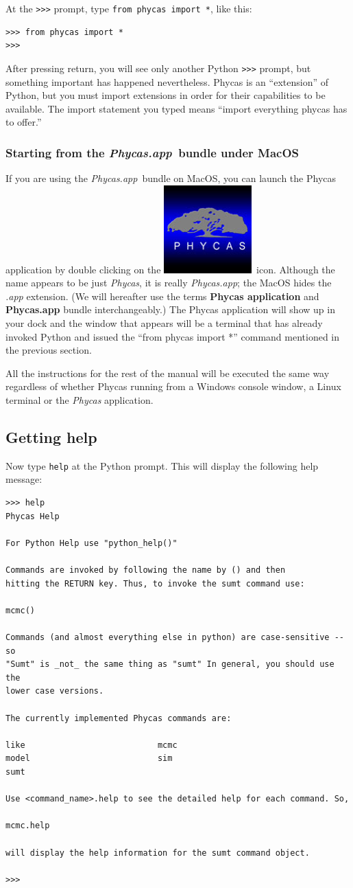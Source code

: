 \documentclass[10pt]{article}
\newcommand{\pathname}[1]{{\em #1}}			%
\newcommand{\code}[1]{{\tt #1}}				%
\newcommand{\cmd}[1]{{\tt \small #1}\index{#1}}		%
\newcommand{\term}[1]{{\bfseries #1}\index{#1}}		%
\newcommand{\phycasapp}{\pathname{Phycas.app}}
\newcommand{\phycasicon}{\includegraphics[scale=0.1]{images/PhycasGUI}}
\begin{document}
At the \code{>>>} prompt, type \code{from phycas import *}, like this:
\begin{verbatim}
>>> from phycas import *
>>>
\end{verbatim}

After pressing return, you will see only another Python \code{>>>} prompt, but something important has happened nevertheless. Phycas is an ``extension'' of Python, but you must import extensions in order for their capabilities to be available. The import statement you typed means ``import everything phycas has to offer.'' 

\subsubsection{Starting from the \phycasapp\ bundle under MacOS}
If you are using the \phycasapp\ bundle on MacOS, you can launch the Phycas application by double clicking on the \phycasicon\ icon. Although the name appears to be just \pathname{Phycas}, it is really \phycasapp; the MacOS hides the \pathname{.app} extension. (We will hereafter use the terms \term{Phycas application} and \term{Phycas.app} bundle interchangeably.) The Phycas application will show up in your dock and the window that appears will be a terminal that has already invoked Python and issued the ``from phycas import *'' command mentioned in the previous section.

All the instructions for the rest of the manual will be executed the same way regardless of whether Phycas running from a Windows console window, a Linux terminal or the \pathname{Phycas} application.

\subsection{Getting help}
Now type \cmd{help} at the Python prompt. This will display the following help message:
\begin{verbatim}
>>> help
Phycas Help
    
For Python Help use "python_help()"

Commands are invoked by following the name by () and then
hitting the RETURN key. Thus, to invoke the sumt command use:

mcmc()

Commands (and almost everything else in python) are case-sensitive -- so
"Sumt" is _not_ the same thing as "sumt" In general, you should use the
lower case versions.

The currently implemented Phycas commands are:
  
like                           mcmc
model                          sim
sumt                           

Use <command_name>.help to see the detailed help for each command. So,

mcmc.help

will display the help information for the sumt command object.

>>> 
\end{verbatim}
\end{document}
